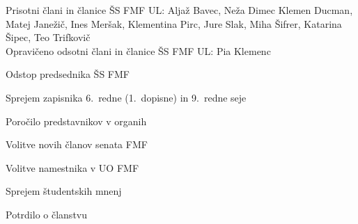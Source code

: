 \documentclass{seja}
\begin{document}
Prisotni člani in članice ŠS FMF UL:
Aljaž Bavec,
Neža Dimec
Klemen Ducman,
Matej Janežič,
Ines Meršak,
Klementina Pirc,
Jure Slak,
Miha Šifrer,
Katarina Šipec,
Teo Trifkovič
\\
Opravičeno odsotni člani in članice ŠS FMF UL:
Pia Klemenc

\begin{red*}
  \item Odstop predsednika ŠS FMF
  \item Sprejem zapisnika 6.~redne (1.~dopisne) in 9.~redne seje
  \item Poročilo predstavnikov v organih 
  \item Volitve novih članov senata FMF
  \item Volitve namestnika v UO FMF
  \item Sprejem študentskih mnenj
  \item Potrdilo o članstvu
\end{red*}
\end{document}
